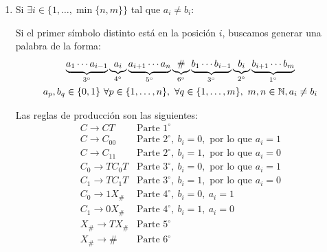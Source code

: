 \begin{ejercicio}
\begin{enumerate}
        \item Si $\exists i\in \{1,\ldots,\min\{n,m\}\}$ tal que $a_i\neq b_i$:
        
        Si el primer símbolo distinto está en la posición $i$, buscamos generar una palabra de la forma:
        \begin{multline*}
            \underbrace{a_1\cdots a_{i-1}}_{3^\circ}
            \underbrace{a_i}_{4^\circ}
            \underbrace{a_{i+1}\cdots a_n}_{5^\circ}
            \underbrace{\#}_{6^\circ}
            \underbrace{b_1\cdots b_{i-1}}_{3^\circ}
            \underbrace{b_i}_{2^\circ}
            \underbrace{b_{i+1}\cdots b_m}_{1^\circ}
            \\ a_p,b_q\in \{0,1\}~\forall p\in \{1,\ldots,n\},~\forall q\in \{1,\ldots,m\},~m,n\in \mathbb{N},a_i\neq b_i
        \end{multline*}

        Las reglas de producción son las siguientes:
        \begin{equation*}
            \begin{array}{ll}
                C\to CT         & \text{Parte }1^\circ\\
                C\to C_00       & \text{Parte }2^\circ,~b_i=0,\text{ por lo que }a_i=1\\
                C\to C_11       & \text{Parte }2^\circ,~b_i=1,\text{ por lo que }a_i=0\\
                C_0\to TC_0T    & \text{Parte }3^\circ,~b_i=0,\text{ por lo que }a_i=1\\
                C_1\to TC_1T    & \text{Parte }3^\circ,~b_i=1,\text{ por lo que }a_i=0\\
                C_0\to 1X_{\#}  & \text{Parte }4^\circ,~b_i=0,~a_i=1\\
                C_1\to 0X_{\#}  & \text{Parte }4^\circ,~b_i=1,~a_i=0\\
                X_{\#}\to T X_{\#} & \text{Parte }5^\circ\\
                X_{\#}\to \#    & \text{Parte }6^\circ
            \end{array}
        \end{equation*}        
    \end{enumerate}


\end{ejercicio}
